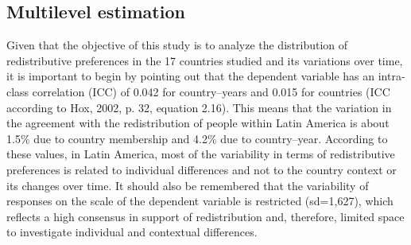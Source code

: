 \documentclass[utf8]{frontiersSCNS} %
\begin{document}
\subsection{Multilevel estimation}

Given that the objective of this study is to analyze the distribution of redistributive preferences in the 17 countries studied and its variations over time, it is important to begin by pointing out that the dependent variable has an intra-class correlation (ICC) of 0.042 for country–years and 0.015 for countries (ICC according to Hox, 2002, p. 32, equation 2.16). This means that the variation in the agreement with the redistribution of people within Latin America is about 1.5\% due to country membership and 4.2\% due to country–year. According to these values, in Latin America, most of the variability in terms of redistributive preferences is related to individual differences and not to the country context or its changes over time. It should also be remembered that the variability of responses on the scale of the dependent variable is restricted (sd=1,627), which reflects a high consensus in support of redistribution and, therefore, limited space to investigate individual and contextual differences.
\end{document}
